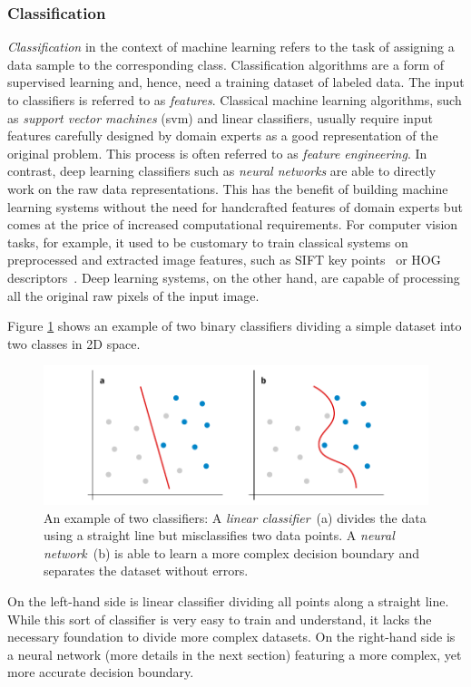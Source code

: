 \subsubsection{Classification}
\emph{Classification} in the context of machine learning refers to the task of assigning a data sample to the corresponding class. Classification algorithms are a form of supervised learning and, hence, need a training dataset of labeled data. The input to classifiers is referred to as \emph{features}. Classical machine learning algorithms, such as \emph{support vector machines} (\ac{svm}) and linear classifiers, usually require input features carefully designed by domain experts as a good representation of the original problem. This process is often referred to as \emph{feature engineering}. In contrast, deep learning classifiers such as \emph{neural networks} are able to directly work on the raw data representations. This has the benefit of building machine learning systems without the need for handcrafted features of domain experts but comes at the price of increased computational requirements. For computer vision tasks, for example, it used to be customary to train classical systems on preprocessed and extracted image features, such as SIFT key points~\cite{lowe1999object} or HOG descriptors~\cite{dalal2005histograms}. Deep learning systems, on the other hand, are capable of processing all the original raw pixels of the input image.


Figure \ref{fig:classifiers} shows an example of two binary classifiers dividing a simple dataset into two classes in 2D space.
%
	\begin{figure}[tp]
  		\centering
    	\includegraphics{img/classifiers.pdf}
    	\caption{An example of two classifiers: A \emph{linear classifier}~(a) divides the data using a straight line but misclassifies two data points. A \emph{neural network}~(b) is able to learn a more complex decision boundary and separates the dataset without errors.}
    	\label{fig:classifiers}
	\end{figure}
%
On the left-hand side is linear classifier dividing all points along a straight line. While this sort of classifier is very easy to train and understand, it lacks the necessary foundation to divide more complex datasets. On the right-hand side is a neural network (more details in the next section) featuring a more complex, yet more accurate decision boundary.

